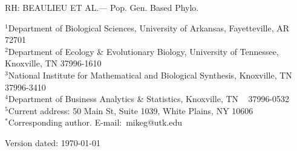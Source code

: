\documentclass[12pt,letterpaper]{article}
\date{Last compiled on \today\xspace at \currenttime.}
\begin{document}
\noindent RH: BEAULIEU ET AL.--- Pop. Gen. Based Phylo.

\bigskip
\medskip
\begin{center}

\bigskip





\end{center}

\vfill

{\small
\noindent$^1$Department of Biological Sciences, University of Arkansas, Fayetteville, AR 72701\\
\noindent$^{2}$Department of Ecology \& Evolutionary Biology, University of Tennessee, Knoxville, TN 37996-1610\\
\noindent$^{3}$National Institute for Mathematical and Biological Synthesis, Knoxville, TN 37996-3410\\
\noindent$^{4}$Department of Business Analytics \& Statistics, Knoxville, TN ~ 37996-0532 \\
\noindent$^{5}$Current address: 50 Main St, Suite 1039, White Plains, NY 10606\\
\noindent$^{*}$Corresponding author. E-mail:~mikeg@utk.edu
}

\vfill
\centerline{Version dated: \today}
\vfill



%
%
\end{document}
